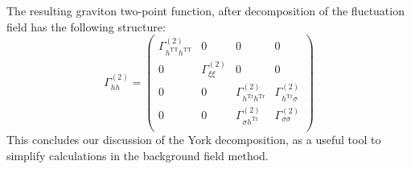  The resulting graviton two-point function, after decomposition of the fluctuation field has the following structure:
\begin{equation} \Gamma^{(2)}_{hh} = 
\begin{pmatrix}
\Gamma^{(2)}_{h^{\mathrm{TT}}h^{\mathrm{TT}}} & 0 & 0 & 0 \\[10pt]
0 & \Gamma^{(2)}_{\xi\xi}  & 0 & 0 \\[10pt]
0 & 0 & \Gamma^{(2)}_{h^{\mathrm{Tr}}h^{\mathrm{Tr}}}  & \Gamma^{(2)}_{h^{\mathrm{Tr}}\sigma} \\[10pt]
0 & 0 & \Gamma^{(2)}_{\sigma h^{\mathrm{Tr}}} & \Gamma^{(2)}_{\sigma\sigma} \\

\end{pmatrix}
\end{equation}
 This concludes our discussion of the York decomposition, as a useful tool to simplify calculations in the background field method.
 
